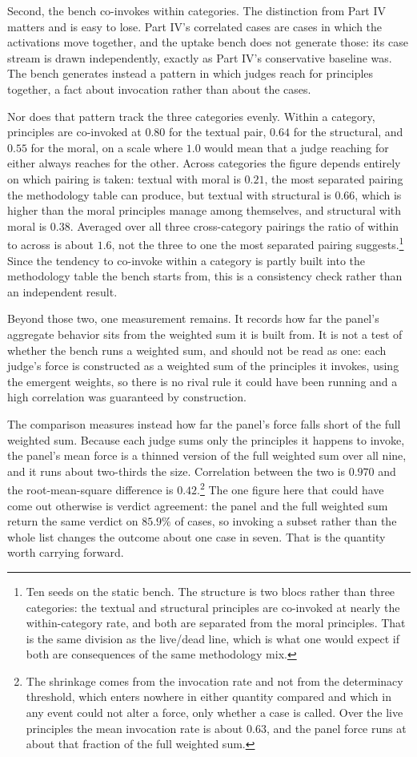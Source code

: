 Second, the bench co-invokes within categories. The distinction from Part IV
matters and is easy to lose. Part IV's correlated cases are cases in which the
activations move together, and the uptake bench does not generate those: its
case stream is drawn independently, exactly as Part IV's conservative baseline
was. The bench generates instead a pattern in which judges reach for
principles together, a fact about invocation rather than about the cases.

Nor does that pattern track the three categories evenly. Within a category,
principles are co-invoked at $0.80$ for the textual pair, $0.64$ for the
structural, and $0.55$ for the moral, on a scale where $1.0$ would mean that a
judge reaching for either always reaches for the other. Across categories the figure depends
entirely on which pairing is taken: textual with moral is $0.21$, the most
separated pairing the methodology table can produce, but textual with
structural is $0.66$, which is higher than the moral principles manage among
themselves, and structural with moral is $0.38$. Averaged over all three
cross-category pairings the ratio of within to across is about $1.6$, not the
three to one the most separated pairing suggests.\footnote{Ten seeds on the
static bench. The structure is two blocs rather than three categories: the
textual and structural principles are co-invoked at nearly the within-category
rate, and both are separated from the moral principles. That is the same
division as the live/dead line, which is what one would expect if both are
consequences of the same methodology mix.} Since the tendency to co-invoke within a category is
partly built into the methodology table the bench starts from, this is a
consistency check rather than an independent result.

Beyond those two, one measurement remains. It records how far
the panel's aggregate behavior sits from the weighted sum it is built from. It is not a test of whether the bench runs
a weighted sum, and should not be read as one: each judge's force is
constructed as a weighted sum of the principles it invokes, using the emergent
weights, so there is no rival rule it could have been running and a high
correlation was guaranteed by construction.

The comparison measures instead how far the panel's force falls short of the
full weighted sum. Because each judge sums only the principles it happens to invoke, the
panel's mean force is a thinned version of the full weighted sum over all
nine, and it runs about two-thirds the size. Correlation between the two is
$0.970$ and the root-mean-square difference is $0.42$.\footnote{The shrinkage
comes from the invocation rate and not from the determinacy threshold, which enters nowhere in
either quantity compared and which in any event could not alter a force, only
whether a case is called. Over the live principles the mean invocation rate is
about $0.63$, and the panel force runs at about that fraction of the full
weighted sum.} The one figure here that could have come out otherwise is
verdict agreement: the panel and the full weighted sum return the same verdict
on $85.9\%$ of cases, so invoking a subset rather than the whole list changes
the outcome about one case in seven. That is the quantity worth carrying
forward.

